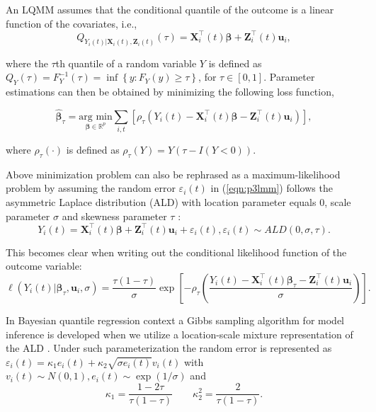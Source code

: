 An LQMM assumes that the conditional quantile of the outcome is a linear function of the covariates, i.e.,
\begin{equation}\label{eqn:p3lqmm}
Q_{Y_{i}(t)|{\boldsymbol X}_{i}(t),{\boldsymbol Z}_{i}(t)}(\tau)={\boldsymbol X}_{i}^{\top}(t) \boldsymbol{\beta}+ {\boldsymbol Z}_{i}^{\top}(t)\boldsymbol{u}_i,
\end{equation}

\noindent where the $\tau$th quantile of a random variable $Y$ is defined as $Q_{Y}(\tau)=F_{Y}^{-1}(\tau)=\inf\left\{ y:F_{Y}(y)\geq\tau\right\}$, for $\tau\in [0, 1]$. Parameter estimations can then be obtained by minimizing the following loss function,

\begin{equation*}\label{eqn:p3loss_fun}
\hat{\boldsymbol{\beta}}_{\tau}=\underset{\boldsymbol{\beta}\in \mathbb{R}^{p}}{\mbox{arg min}}\sum_{i, t}\left[\rho_{\tau}\left(Y_{i}(t)-{\boldsymbol X}_{i}^{\top}(t)\boldsymbol{\beta} - {\boldsymbol Z}_{i}^{\top}(t)\boldsymbol{u}_i\right)\right],
\end{equation*}

\noindent where $\rho_{\tau}(\cdot)$ is defined as $\rho_{\tau}(Y)=Y(\tau-{I}{(Y<0)}).$


Above minimization problem can also be rephrased as a maximum-likelihood problem by assuming the random error $\varepsilon_{i}(t)$ in (\ref{eqn:p3lmm}) follows the asymmetric Laplace distribution (ALD) with location parameter equals 0, scale parameter $\sigma$ and skewness parameter $\tau$ \citep{koenker1999goodness,yu2001bayesian}:
\begin{equation*}
Y_{i}(t) ={\boldsymbol X}_{i}^{\top}(t) \boldsymbol{\beta}+ {\boldsymbol Z}_{i}^{\top}(t)\boldsymbol{u}_i + \varepsilon_{i}(t), \varepsilon_{i}(t)\sim ALD(0, \sigma, \tau).
\end{equation*}

This becomes clear when writing out the conditional likelihood function of the outcome variable:
\begin{equation*}\label{eqn:p3ald_lqmm}
\ell(Y_{i}(t)|\boldsymbol{\beta}_{\tau},\boldsymbol{u}_i,\sigma)=\frac{\tau(1-\tau)}{\sigma}\exp\left[-\rho_{\tau}\left(\frac{Y_{i}(t)-{\boldsymbol X}_{i}^{\top}(t)\boldsymbol{\beta}_{\tau}-{\boldsymbol Z}_{i}^{\top}(t)\boldsymbol{u}_i}{\sigma}\right)\right].
\end{equation*}

In Bayesian quantile regression context a Gibbs sampling algorithm for model inference is developed when we utilize a location-scale mixture representation of the ALD \citep{kotz2001laplace}. Under such parameterization the random error is represented as $\varepsilon_{i}(t)=\kappa_1e_{i}(t)+\kappa_2\sqrt{\sigma e_{i}(t)}v_{i}(t)$ with $v_{i}(t)\sim N(0,1), e_{i}(t)\sim\exp(1/\sigma)$ and
\[\kappa_1=\frac{1-2\tau}{\tau(1-\tau)}\hspace{2em} \kappa_2^2=\frac{2}{\tau(1-\tau)}.\]


